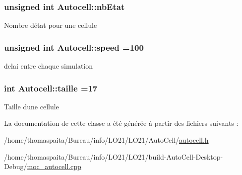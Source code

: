 \subsubsection[{\texorpdfstring{nb\+Etat}{nbEtat}}]{\setlength{\rightskip}{0pt plus 5cm}unsigned int Autocell\+::nb\+Etat\hspace{0.3cm}{\ttfamily [protected]}}\hypertarget{class_autocell_a35a3592704f2fe987c846017b0fc83b2}{}\label{class_autocell_a35a3592704f2fe987c846017b0fc83b2}
Nombre d\textquotesingle{}état pour une cellule 
\subsubsection[{\texorpdfstring{speed}{speed}}]{\setlength{\rightskip}{0pt plus 5cm}unsigned int Autocell\+::speed =100\hspace{0.3cm}{\ttfamily [protected]}}\hypertarget{class_autocell_a52291657adce98a0443559a5cd2e0c0b}{}\label{class_autocell_a52291657adce98a0443559a5cd2e0c0b}
delai entre chaque simulation 
\subsubsection[{\texorpdfstring{taille}{taille}}]{\setlength{\rightskip}{0pt plus 5cm}int Autocell\+::taille =17\hspace{0.3cm}{\ttfamily [protected]}}\hypertarget{class_autocell_abcfd3af5e49b6a5b4538fb22a5f06d81}{}\label{class_autocell_abcfd3af5e49b6a5b4538fb22a5f06d81}
Taille d\textquotesingle{}une cellule 

La documentation de cette classe a été générée à partir des fichiers suivants \+:\begin{DoxyCompactItemize}
\item 
/home/thomaspaita/\+Bureau/info/\+L\+O21/\+L\+O21/\+Auto\+Cell/\hyperlink{autocell_8h}{autocell.\+h}\item 
/home/thomaspaita/\+Bureau/info/\+L\+O21/\+L\+O21/build-\/\+Auto\+Cell-\/\+Desktop-\/\+Debug/\hyperlink{moc__autocell_8cpp}{moc\+\_\+autocell.\+cpp}\end{DoxyCompactItemize}
